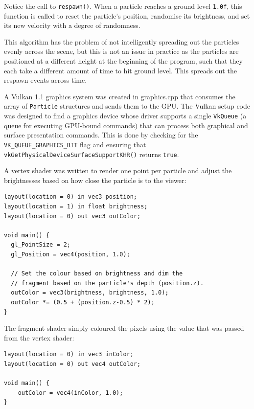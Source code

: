 \documentclass[11pt, a4paper, twocolumn]{article}
\begin{document}
Notice the call to \verb|respawn()|. When a particle reaches a ground level \verb|1.0f|, this function is called to reset the particle's position, randomise its brightness, and set its new velocity with a degree of randomness.

This algorithm has the problem of not intelligently spreading out the particles evenly across the scene, but this is not an issue in practice as the particles are positioned at a different height at the beginning of the program, such that they each take a different amount of time to hit ground level. This spreads out the respawn events across time.

A Vulkan 1.1 graphics system was created in graphics.cpp that consumes the array of \verb|Particle| structures and sends them to the GPU. The Vulkan setup code was designed to find a graphics device whose driver supports a single \verb|VkQueue| (a queue for executing GPU-bound commands) that can process both graphical and surface presentation commands. This is done by checking for the \verb|VK_QUEUE_GRAPHICS_BIT| flag and ensuring that \verb|vkGetPhysicalDeviceSurfaceSupportKHR()| returns \verb|true|.

A vertex shader was written to render one point per particle and adjust the brightnesses based on how close the particle is to the viewer:

\begin{verbatim}
layout(location = 0) in vec3 position;
layout(location = 1) in float brightness;
layout(location = 0) out vec3 outColor;

void main() {
  gl_PointSize = 2;
  gl_Position = vec4(position, 1.0);

  // Set the colour based on brightness and dim the
  // fragment based on the particle's depth (position.z).
  outColor = vec3(brightness, brightness, 1.0);
  outColor *= (0.5 + (position.z-0.5) * 2);
}
\end{verbatim}

The fragment shader simply coloured the pixels using the value that was passed from the vertex shader:

\begin{verbatim}
layout(location = 0) in vec3 inColor;
layout(location = 0) out vec4 outColor;

void main() {
    outColor = vec4(inColor, 1.0);
}
\end{verbatim}
\end{document}
